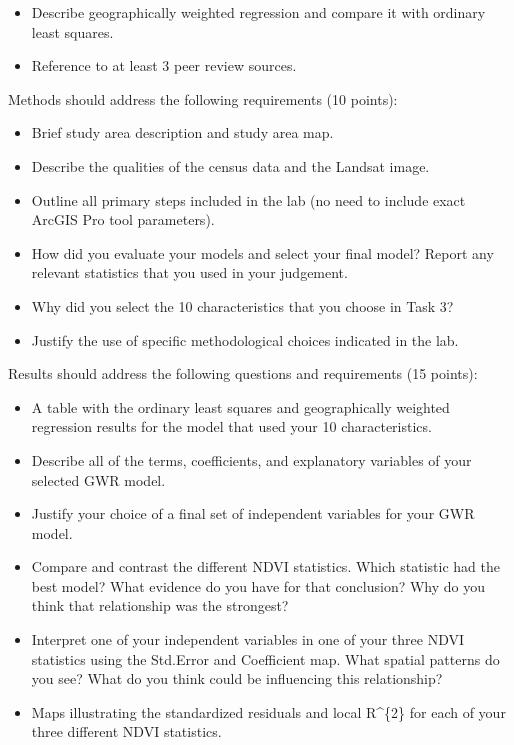 \documentclass[
]{book}
\begin{document}
\begin{itemize}
\item
  Describe geographically weighted regression and compare it with ordinary least squares.
\item
  Reference to at least 3 peer review sources.
\end{itemize}

Methods should address the following requirements (10 points):

\begin{itemize}
\item
  Brief study area description and study area map.
\item
  Describe the qualities of the census data and the Landsat image.
\item
  Outline all primary steps included in the lab (no need to include exact ArcGIS Pro tool parameters).
\item
  How did you evaluate your models and select your final model? Report any relevant statistics that you used in your judgement.
\item
  Why did you select the 10 characteristics that you choose in Task 3?
\item
  Justify the use of specific methodological choices indicated in the lab.
\end{itemize}

Results should address the following questions and requirements (15 points):

\begin{itemize}
\item
  A table with the ordinary least squares and geographically weighted regression results for the model that used your 10 characteristics.
\item
  Describe all of the terms, coefficients, and explanatory variables of your selected GWR model.
\item
  Justify your choice of a final set of independent variables for your GWR model.
\item
  Compare and contrast the different NDVI statistics. Which statistic had the best model? What evidence do you have for that conclusion? Why do you think that relationship was the strongest?
\item
  Interpret one of your independent variables in one of your three NDVI statistics using the Std.Error and Coefficient map. What spatial patterns do you see? What do you think could be influencing this relationship?
\item
  Maps illustrating the standardized residuals and local R\^{}\{2\} for each of your three different NDVI statistics.
\end{itemize}
\end{document}
